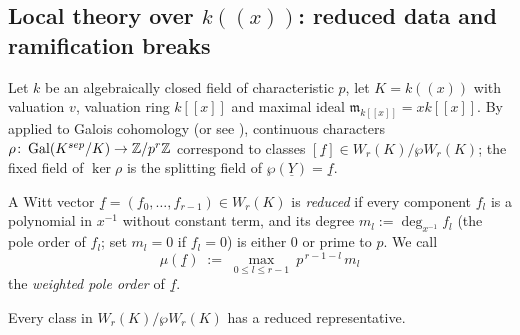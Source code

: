 \documentclass[11pt]{article}
\newcommand{\wv}[1]{\underline{#1}}                 %
\newcommand{\mm}{\mathfrak{m}_{k[[x]]}}             %
\begin{document}
\subsection{Local theory over \texorpdfstring{$k((x))$}{k((x))}: reduced data and ramification breaks}

Let $k$ be an algebraically closed field of characteristic $p$, let
$K=k((x))$ with valuation $v$, valuation ring $k[[x]]$ and maximal ideal
$\mm=xk[[x]]$.  By  applied to Galois cohomology
(or see \cite{Thomas2005}), continuous characters
$\rho\colon\operatorname{Gal}(K^{sep}/K)\to\mathbb{Z}/p^r\mathbb{Z}$ correspond to classes
$[\wv f]\in W_r(K)/\wp W_r(K)$; the fixed field of $\ker\rho$ is the
splitting field of $\wp(\wv Y)=\wv f$.

\begin{definition}\label{def:reduced}
A Witt vector $\wv f=(f_0,\dots,f_{r-1})\in W_r(K)$ is \emph{reduced} if
every component $f_l$ is a polynomial in $x^{-1}$ without constant term,
and its degree $m_l:=\deg_{x^{-1}}f_l$ (the pole order of $f_l$; set
$m_l=0$ if $f_l=0$) is either $0$ or prime to $p$.
We call
\[
\mu(\wv f)\;:=\;\max_{0\le l\le r-1}\ p^{\,r-1-l}\,m_l
\]
the \emph{weighted pole order} of $\wv f$.
\end{definition}

\begin{lemma}\label{lem:reduction}
Every class in $W_r(K)/\wp W_r(K)$ has a reduced representative.
\end{lemma}
\end{document}
